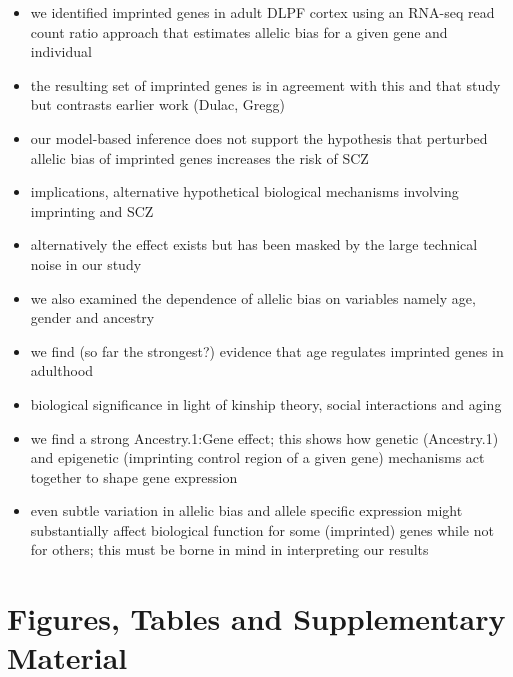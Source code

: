 \documentclass[letterpaper]{article}
\begin{document}
\begin{itemize}
\item we identified imprinted genes in adult DLPF cortex using an RNA-seq read count ratio approach
that estimates allelic bias for a given gene and individual
\item the resulting set of imprinted genes is in agreement with this and that
study but contrasts earlier work (Dulac, Gregg)
\item our model-based inference does not support the hypothesis that perturbed allelic bias
of imprinted genes increases the risk of SCZ
\item implications, alternative hypothetical biological mechanisms involving
imprinting and SCZ
\item alternatively the effect exists but has been masked by the large technical noise in our study
\item
we also examined the dependence of allelic bias on variables namely age,
gender and ancestry
\item we find (so far the strongest?) evidence that age regulates imprinted genes in adulthood
\item biological significance in light of kinship theory, social interactions and aging
\item we find a strong Ancestry.1:Gene effect; this shows how genetic (Ancestry.1) and epigenetic (imprinting control region of a given gene) mechanisms act together to shape gene expression
\item even subtle variation in allelic bias and allele specific expression might substantially affect biological function for some (imprinted) genes while not for others; this must be borne in mind in interpreting our results
\end{itemize}




\newpage

\section{Figures, Tables and Supplementary Material}
\end{document}
